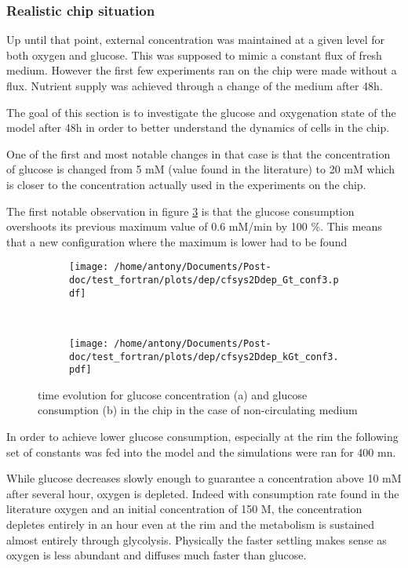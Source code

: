 \documentclass[11pt,a4paper]{article}
\begin{document}
\subsubsection{Realistic chip situation}
Up until that point, external concentration was maintained at a given level for both oxygen and glucose. This was supposed to mimic a constant flux of fresh medium. However the first few experiments ran on the chip were made without a flux. Nutrient supply was achieved through a change of the medium after 48h.

The goal of this section is to investigate the glucose and oxygenation state of the model after 48h  in order to better understand the dynamics of cells in the chip.

One of the first and most notable changes in that case is that the concentration of glucose is changed from 5 mM (value found in the literature) to 20 mM which is closer to the concentration actually used in the experiments on the chip.

The first notable observation in figure \ref{GtkGtdepconf3} is that the glucose consumption overshoots its previous maximum value of 0.6 mM/min by 100 \%. This means that a new configuration where the maximum is lower had to be found

\begin{figure}[ht!]
	\begin{subfigure}{0.45\textwidth}
	\centering
	\texttt{[image: /home/antony/Documents/Post-doc/test\_fortran/plots/dep/cfsys2Ddep\_Gt\_conf3.pdf]}
	\caption{ \label{Gtdep_conf3}}
	\end{subfigure}
	~~
	\begin{subfigure}{0.45\textwidth}
	\texttt{[image: /home/antony/Documents/Post-doc/test\_fortran/plots/dep/cfsys2Ddep\_kGt\_conf3.pdf]}
		\caption{ \label{kGtdep_conf3}}
	\end{subfigure}
	\caption{time evolution for glucose concentration (a) and glucose consumption (b) in the chip in the case of non-circulating medium \label{GtkGtdepconf3}}
\end{figure}

In order to achieve lower glucose consumption, especially at the rim  the following set of constants was fed into the model and the simulations were ran for 400 mn.

While glucose decreases slowly enough to guarantee a concentration above 10 mM after several hour, oxygen is depleted. Indeed with consumption rate  found in the literature oxygen and an initial concentration of 150 \textmu M, the concentration depletes entirely in an hour even at the rim and the metabolism is sustained almost entirely through glycolysis. Physically the faster settling makes sense as oxygen is less abundant and diffuses much faster than glucose.
\end{document}
